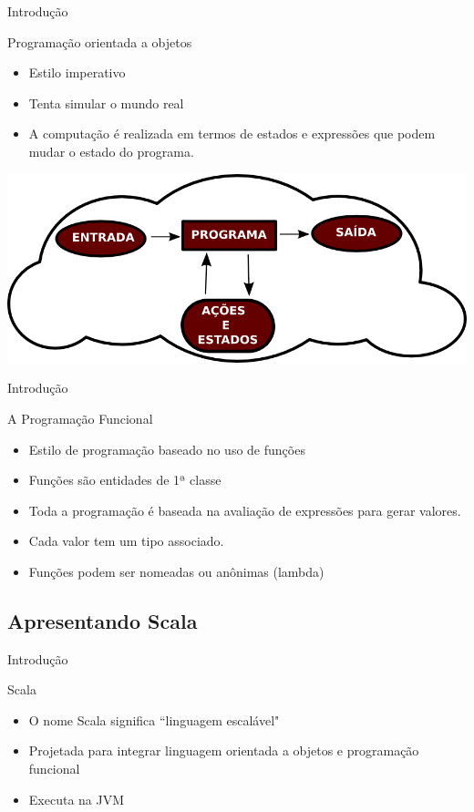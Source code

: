 \begin{frame}{Introdução}
	\begin{block}{Programação orientada a objetos}
		\begin{itemize}
			\item Estilo imperativo 
			\item Tenta simular o mundo real
			\item A computação é realizada em termos de estados e expressões que podem
			mudar o estado do programa.
		\end{itemize}
	\end{block}
	\begin{center}
		\includegraphics[scale=0.3]{introducao/progImp.png}
	\end{center}
\end{frame}

\begin{frame}{Introdução}
	\begin{block}{A Programação Funcional}
		\begin{itemize}
			\item Estilo de programação baseado no uso de funções
			\item Funções são entidades de 1ª classe 
			\item Toda a programação é baseada na avaliação de expressões para gerar valores. 
			\item Cada valor tem um tipo associado.
			\item Funções podem ser nomeadas ou anônimas (lambda)
		\end{itemize}
	\end{block}
\end{frame}

\subsection{Apresentando Scala}
\begin{frame}{Introdução}
	\begin{block}{Scala}
        \begin{itemize}
            \item O nome Scala significa ``linguagem escalável"
            \item Projetada para integrar linguagem orientada a objetos e programação funcional
            \item Executa na JVM
        \end{itemize}
	\end{block}
\end{frame}

